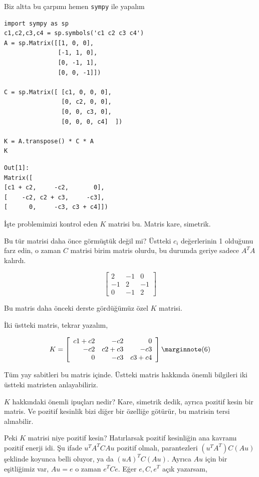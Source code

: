 \documentclass[12pt,fleqn]{article}\usepackage{../../common}
\begin{document}
Biz altta bu çarpımı hemen \verb!sympy! ile yapalım
  
\begin{verbatim}
import sympy as sp
c1,c2,c3,c4 = sp.symbols('c1 c2 c3 c4')
A = sp.Matrix([[1, 0, 0],
               [-1, 1, 0],
               [0, -1, 1],
               [0, 0, -1]])

C = sp.Matrix([ [c1, 0, 0, 0],
                [0, c2, 0, 0],
                [0, 0, c3, 0],
                [0, 0, 0, c4]  ])

K = A.transpose() * C * A
K
\end{verbatim}

\begin{verbatim}
Out[1]: 
Matrix([
[c1 + c2,     -c2,       0],
[    -c2, c2 + c3,     -c3],
[      0,     -c3, c3 + c4]])
\end{verbatim}

İşte problemimizi kontrol eden $K$ matrisi bu. Matris kare, simetrik.

Bu tür matrisi daha önce görmüştük değil mi? Üstteki $c_i$ değerlerinin 1
olduğunu farz edin, o zaman $C$ matrisi birim matris olurdu, bu durumda
geriye sadece $A^T A$ kalırdı.

$$
\left[\begin{array}{rrr}
2 & -1 & 0 \\ -1 & 2 & -1 \\ 0 & -1 & 2
\end{array}\right]
$$

Bu matris daha önceki derste gördüğümüz özel $K$ matrisi. 

İki üstteki matris, tekrar yazalım,

$$ K = 
\left[\begin{array}{rrr}
c1 + c2   &     -c2 &       0 \\
-c2       & c2 + c3 &     -c3 \\
0         & -c3     &      c3 + c4
\end{array}\right]
\mlabel{6}
$$

Tüm yay sabitleri bu matris içinde. Üstteki matris hakkında önemli bilgileri
iki üstteki matristen anlayabiliriz. 

$K$ hakkındaki önemli ipuçları nedir? Kare, simetrik dedik, ayrıca pozitif kesin
bir matris. Ve pozitif kesinlik bizi diğer bir özelliğe götürür, bu matrisin
tersi alınabilir.

Peki $K$ matrisi niye pozitif kesin? Hatırlarsak pozitif kesinliğin ana kavramı
pozitif enerji idi. Şu ifade $u^T A^T C A u$ pozitif olmalı, parantezleri 
$(u^T A^T) C (A u)$ şeklinde koyunca belli oluyor, ya da $(u A)^T C (A u)$. 
Ayrıca $Au$ için bir eşitliğimiz var, $Au = e$ o zaman $e^T C e$. Eğer $e,C,e^T$
açık yazarsam,
\end{document}
